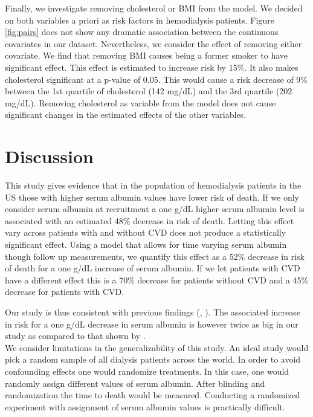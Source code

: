\documentclass[paper=a4, fontsize=11pt]{scrartcl} %
\numberwithin{equation}{section} %
\numberwithin{figure}{section} %
\numberwithin{table}{section} %
\begin{document}
Finally, we investigate removing cholesterol or BMI from the model. We decided on both variables a priori as risk factors in hemodialysis patients. Figure \ref{fig:pairs} does not show any dramatic association between the continuous covariates in our dataset. Nevertheless, we consider the effect of removing either covariate. We find that removing BMI causes being a former smoker to have significant effect. This effect is estimated to increase risk by 15\%. It also makes cholesterol significant at a p-value of 0.05. This would cause a risk decrease of 9\% between the 1st quartile of cholesterol (142 mg/dL) and the 3rd quartile (202 mg/dL). Removing cholesterol as variable from the model does not cause significant changes in the estimated effects of the other variables.


\section{Discussion}
This study gives evidence that in the population of hemodialysis patients in the US those with higher serum albumin values have lower risk of death. If we only consider serum albumin at recruitment a one g/dL higher serum albumin level is associated with an estimated 48\% decrease in risk of death. Letting this effect vary across patients with and without CVD does not produce a statistically significant effect. Using a model that allows for time varying serum albumin though follow up measurements, we quantify this effect as a 52\% decrease in risk of death for a one g/dL increase of serum albumin. If we let patients with CVD have a different effect this is a 70\% decrease for patients without CVD and a 45\% decrease for patients with CVD.

Our study is thus consistent with previous findings (\cite{mutsert}, \cite{kalantar}). The associated increase in risk for a one g/dL decrease in serum albumin is however twice as big in our study as compared to that shown by \cite{mutsert}.\\
We consider limitations in the generalizability of this study. An ideal study would pick a random sample of all dialysis patients across the world. In order to avoid confounding effects one would randomize treatments. In this case, one would randomly assign different values of serum albumin. After blinding and randomization the time to death would be measured. Conducting a randomized experiment with assignment of serum albumin values is practically difficult.\\
\end{document}
